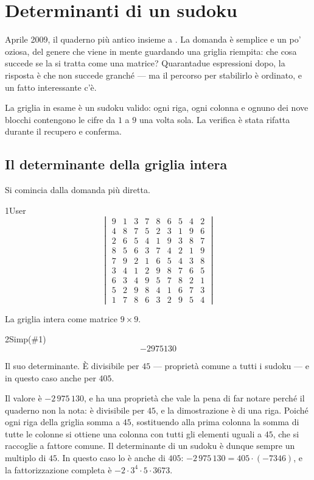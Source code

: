 \chapter{Determinanti di un sudoku}
\label{cap:sudoku}

Aprile 2009, il quaderno più antico insieme a . La domanda è semplice e un po' oziosa, del genere che viene in mente guardando una griglia riempita: che cosa succede se la si tratta come una matrice? Quarantadue espressioni dopo, la risposta è che non succede granché — ma il percorso per stabilirlo è ordinato, e un fatto interessante c'è.

La griglia in esame è un sudoku valido: ogni riga, ogni colonna e ognuno dei nove blocchi contengono le cifre da $1$ a $9$ una volta sola. La verifica è stata rifatta durante il recupero e conferma.

\section{Il determinante della griglia intera}

Si comincia dalla domanda più diretta.

\begin{espr}{1}{User}{}
\[
\begin{vmatrix} 9 & 1 & 3 & 7 & 8 & 6 & 5 & 4 & 2 \\ 4 & 8 & 7 & 5 & 2 & 3 & 1 & 9 & 6 \\ 2 & 6 & 5 & 4 & 1 & 9 & 3 & 8 & 7 \\ 8 & 5 & 6 & 3 & 7 & 4 & 2 & 1 & 9 \\ 7 & 9 & 2 & 1 & 6 & 5 & 4 & 3 & 8 \\ 3 & 4 & 1 & 2 & 9 & 8 & 7 & 6 & 5 \\ 6 & 3 & 4 & 9 & 5 & 7 & 8 & 2 & 1 \\ 5 & 2 & 9 & 8 & 4 & 1 & 6 & 7 & 3 \\ 1 & 7 & 8 & 6 & 3 & 2 & 9 & 5 & 4 \end{vmatrix}
\]
\end{espr}
La griglia intera come matrice $9\times9$.

\begin{espr}{2}{Simp(\#1)}{}
\[
-2975130
\]
\end{espr}
Il suo determinante. È divisibile per $45$ — proprietà comune a tutti i sudoku — e in questo caso anche per $405$.


Il valore è $-2\,975\,130$, e ha una proprietà che vale la pena di far notare perché il quaderno non la nota: è divisibile per $45$, e la dimostrazione è di una riga. Poiché ogni riga della griglia somma a $45$, sostituendo alla prima colonna la somma di tutte le colonne si ottiene una colonna con tutti gli elementi uguali a $45$, che si raccoglie a fattore comune. Il determinante di un sudoku è dunque sempre un multiplo di $45$. In questo caso lo è anche di $405$: $-2\,975\,130=405\cdot(-7346)$, e la fattorizzazione completa è $-2\cdot3^4\cdot5\cdot3673$.

